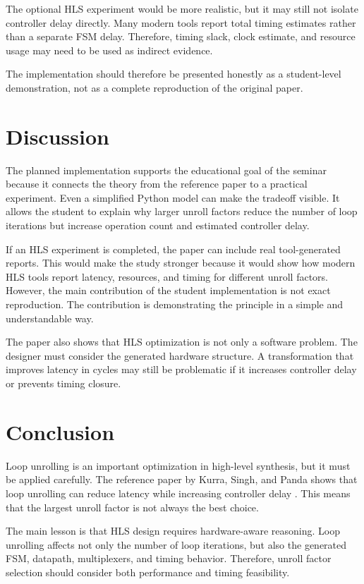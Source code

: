 \documentclass[conference]{IEEEtran}
\begin{document}
The optional HLS experiment would be more realistic, but it may still not isolate controller delay directly. Many modern tools report total timing estimates rather than a separate FSM delay. Therefore, timing slack, clock estimate, and resource usage may need to be used as indirect evidence.

The implementation should therefore be presented honestly as a student-level demonstration, not as a complete reproduction of the original paper.

\section{Discussion}

The planned implementation supports the educational goal of the seminar because it connects the theory from the reference paper to a practical experiment. Even a simplified Python model can make the tradeoff visible. It allows the student to explain why larger unroll factors reduce the number of loop iterations but increase operation count and estimated controller delay.

If an HLS experiment is completed, the paper can include real tool-generated reports. This would make the study stronger because it would show how modern HLS tools report latency, resources, and timing for different unroll factors. However, the main contribution of the student implementation is not exact reproduction. The contribution is demonstrating the principle in a simple and understandable way.

The paper also shows that HLS optimization is not only a software problem. The designer must consider the generated hardware structure. A transformation that improves latency in cycles may still be problematic if it increases controller delay or prevents timing closure.

\section{Conclusion}

Loop unrolling is an important optimization in high-level synthesis, but it must be applied carefully. The reference paper by Kurra, Singh, and Panda shows that loop unrolling can reduce latency while increasing controller delay \cite{kurra2007}. This means that the largest unroll factor is not always the best choice.

The main lesson is that HLS design requires hardware-aware reasoning. Loop unrolling affects not only the number of loop iterations, but also the generated FSM, datapath, multiplexers, and timing behavior. Therefore, unroll factor selection should consider both performance and timing feasibility.
\end{document}
